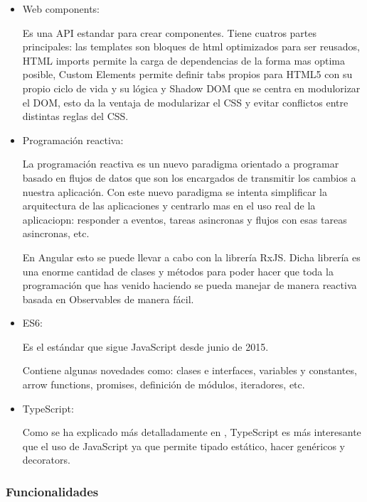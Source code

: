 \documentclass[a4paper, 12pt]{book}
\begin{document}
\begin{itemize}
  \item Web components: 

	Es una API estandar para crear componentes. Tiene cuatros partes principales: las templates son bloques de html optimizados para ser reusados, HTML imports permite la carga de dependencias de la forma mas optima posible, Custom Elements permite definir tabs propios para 		HTML5 con su propio ciclo de vida y su l\'ogica y Shadow DOM que se centra en modulorizar el DOM, esto da la ventaja de modularizar el CSS y evitar conflictos entre distintas reglas del CSS.

\item Programaci\'on reactiva:

La programaci\'on reactiva es un nuevo paradigma orientado a programar basado en flujos de datos que son los encargados de transmitir los cambios a nuestra aplicaci\'on. Con este nuevo paradigma se intenta simplificar la arquitectura de las aplicaciones y centrarlo mas en el uso real de la aplicaciopn: responder a eventos, tareas asincronas y flujos con esas tareas asincronas, etc.

En Angular esto se puede llevar a cabo con la librer\'ia RxJS. Dicha librer\'ia es una enorme cantidad de clases y m\'etodos para poder hacer que toda la programaci\'on que has venido haciendo se pueda manejar de manera reactiva basada en Observables de manera f\'acil.

\item ES6:

Es el est\'andar que sigue JavaScript desde junio de 2015. 

Contiene algunas novedades como: clases e interfaces, variables y constantes, arrow functions, promises, definici\'on de m\'odulos, iteradores, etc.

\item TypeScript:

Como se ha explicado m\'as detalladamente en , TypeScript es m\'as interesante que el uso de JavaScript ya que permite tipado est\'atico, hacer gen\'ericos y decorators.

\end{itemize}

\subsubsection{Funcionalidades}
\label{subsec:func_angular}
\end{document}
